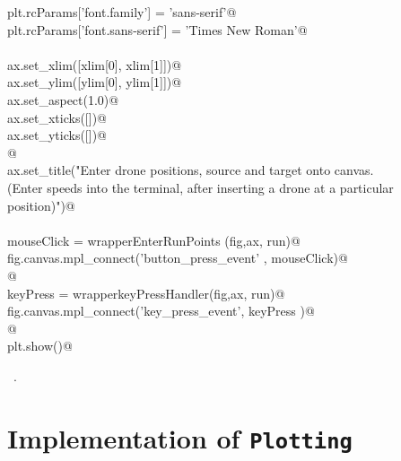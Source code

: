 \documentclass[12pt, english, oneside]{report}
\begin{document}
\begin{appendices}
\begin{flushleft}
\begin{list}{}{}
\mbox{}\verb@    plt.rcParams['font.family'] = 'sans-serif'@\\
\mbox{}\verb@    plt.rcParams['font.sans-serif'] = 'Times New Roman'@\\
\mbox{}\verb@@\\
\mbox{}\verb@    ax.set_xlim([xlim[0], xlim[1]])@\\
\mbox{}\verb@    ax.set_ylim([ylim[0], ylim[1]])@\\
\mbox{}\verb@    ax.set_aspect(1.0)@\\
\mbox{}\verb@    ax.set_xticks([])@\\
\mbox{}\verb@    ax.set_yticks([])@\\
\mbox{}\verb@          @\\
\mbox{}\verb@    ax.set_title("Enter drone positions, source and target onto canvas. \n \@\\
\mbox{}\verb@(Enter speeds into the terminal, after inserting a drone at a particular position)")@\\
\mbox{}\verb@@\\
\mbox{}\verb@    mouseClick   = wrapperEnterRunPoints (fig,ax, run)@\\
\mbox{}\verb@    fig.canvas.mpl_connect('button_press_event' , mouseClick)@\\
\mbox{}\verb@          @\\
\mbox{}\verb@    keyPress     = wrapperkeyPressHandler(fig,ax, run)@\\
\mbox{}\verb@    fig.canvas.mpl_connect('key_press_event', keyPress   )@\\
\mbox{}\verb@    @\\
\mbox{}\verb@    plt.show()@\\
\mbox{}\verb@@{\NWsep}
\end{list}
\vspace{-1.5ex}
\footnotesize
\begin{list}{}{\setlength{\itemsep}{-\parsep}\setlength{\itemindent}{-\leftmargin}}
\item \NWtxtMacroRefIn\ .

\item{}
\end{list}
\vspace{4ex}
\end{flushleft}

\chapter{Implementation of \textlangle\texttt{Plotting}\textrangle}


\end{appendices}
\end{document}
